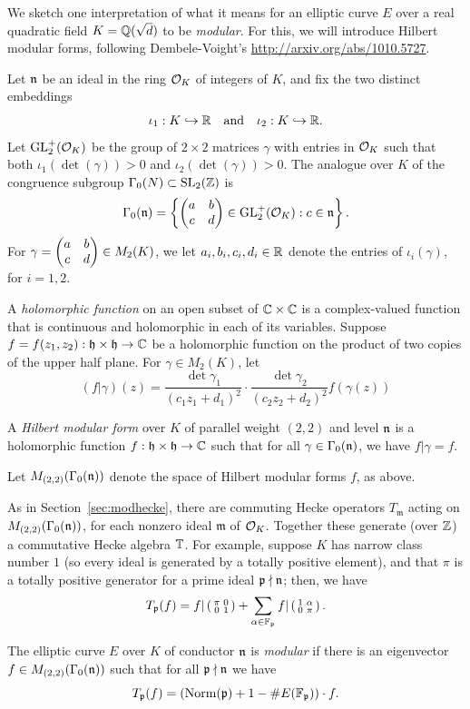 \documentclass{book}
\begin{document}
We sketch one interpretation of
what it means for an elliptic curve $E$
over a real quadratic field $K=\mathbb{Q}(\sqrt{d})$ to be
{\em modular}. For this, we will introduce
Hilbert modular forms, following
Dembele-Voight's \url{http://arxiv.org/abs/1010.5727}.

Let $\mathfrak{n}$ be an ideal in the ring $\mathcal{O}_K$ of integers of $K$,
and fix the two distinct embeddings
$$
\iota_1:K\hookrightarrow \mathbb{R}\quad\text{and}\quad
\iota_2:K\hookrightarrow\mathbb{R}.
$$
Let $\operatorname{GL}_2^+(\mathcal{O}_K)$ be the group of $2\times 2$ matrices
$\gamma$ with entries in $\mathcal{O}_K$ such that
both $\iota_1(\det(\gamma))>0$ and
$\iota_2(\det(\gamma))>0$.
The analogue over $K$ of the congruence subgroup $\Gamma_0(N)\subset\operatorname{SL}_2(\mathbb{Z})$ is
$$
\Gamma_0(\mathfrak{n})
 = \left\{
\left( \begin{matrix}a&b\\c&d \end{matrix}\right) \in \operatorname{GL}_2^+(\mathcal{O}_K)  :
  c \in \mathfrak{n}
   \right\}.
$$
For $\gamma=\left( \begin{matrix}a&b\\c&d \end{matrix}\right)\in M_2(K)$,
we let $a_i,b_i,c_i,d_i\in\mathbb{R}$ denote the entries
of $\iota_i(\gamma)$, for $i=1,2$.

A {\em holomorphic function} on
an open subset of $\mathbb{C}\times \mathbb{C}$ is a complex-valued function
that is continuous and holomorphic in each of its variables.
Suppose $f=f(z_1,z_2):\mathfrak{h}\times \mathfrak{h}\to\mathbb{C}$ be a holomorphic function
on the product of two copies of the upper half plane.
For $\gamma\in M_2(K)$, let
$$
  (f|\gamma)(z) = \frac{\det \gamma_1}{(c_1 z_1 + d_1)^2}
       \cdot  \frac{\det \gamma_2}{(c_2 z_2 + d_2)^2} f(\gamma(z))
$$
\begin{definition}
A {\em Hilbert modular form} over $K$ of parallel
weight $(2,2)$ and level $\mathfrak{n}$
is a holomorphic function
$
f:\mathfrak{h}\times \mathfrak{h} \to \mathbb{C}
$
such that
for all $\gamma \in \Gamma_0(\mathfrak{n})$, we have
$f|\gamma = f$.
\end{definition}
Let $M_{(2,2)}(\Gamma_0(\mathfrak{n}))$ denote the space of
Hilbert modular forms $f$,
as above.

As in Section~\ref{sec:modhecke}, there are commuting Hecke operators
$T_{\mathfrak{m}}$ acting on $M_{(2,2)}(\Gamma_0(\mathfrak{n}))$,
for each nonzero ideal $\mathfrak{m}$ of $\mathcal{O}_K$.
Together these generate (over $\mathbb{Z}$) a commutative
Hecke algebra $\mathbb{T}$.  For example, suppose
$K$ has narrow class number $1$ (so every ideal
is generated by a totally positive element),
and that $\pi$ is a totally positive generator
for a prime ideal $\mathfrak{p}\nmid \mathfrak{n}$; then, we have
$$
 T_{\mathfrak{p}}(f) = f|\left( \begin{smallmatrix}\pi&0\\0&1\end{smallmatrix}\right) +
    \sum_{\alpha\in \mathbb{F}_{\mathfrak{p}}} f | \left( \begin{smallmatrix}1&\alpha\\0&\pi\end{smallmatrix}\right).
$$


The elliptic curve $E$ over $K$ of conductor $\mathfrak{n}$
is {\em modular} if there
is an eigenvector $f \in M_{(2,2)}(\Gamma_0(\mathfrak{n}))$ such that
for all $\mathfrak{p}\nmid \mathfrak{n}$ we have
$$
  T_{\mathfrak{p}}(f) = (\text{Norm}(\mathfrak{p}) + 1 - \#E(\mathbb{F}_{\mathfrak{p}})) \cdot f.
$$
\end{document}

